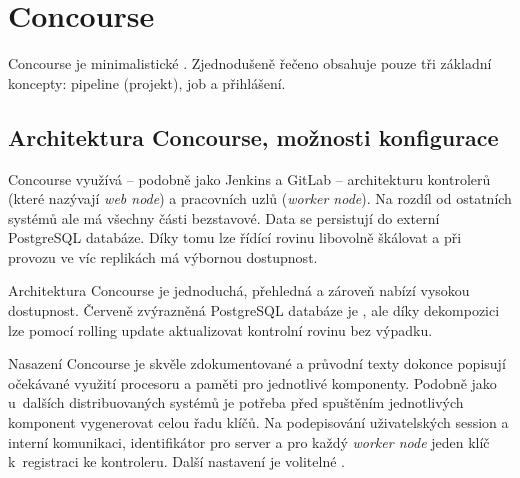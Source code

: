 \section{Concourse}
    Concourse je minimalistické \CI. Zjednodušeně řečeno obsahuje pouze tři základní koncepty: pipeline (projekt), job a přihlášení.

    \subsection{Architektura Concourse, možnosti konfigurace}
        Concourse využívá -- podobně jako Jenkins a GitLab -- architekturu kontrolerů (které nazývají \textit{web node}) a pracovních uzlů (\textit{worker node}). Na rozdíl od ostatních systémů ale má všechny části bezstavové. Data se persistují do externí PostgreSQL databáze. Díky tomu lze řídící rovinu libovolně škálovat a při provozu ve víc replikách má výbornou dostupnost.

        \begin{iffigure}
            \centering
            \caption{Architektura Concourse je jednoduchá, přehledná a zároveň nabízí vysokou dostupnost. Červeně zvýrazněná PostgreSQL databáze je , ale díky dekompozici lze pomocí rolling update aktualizovat kontrolní rovinu bez výpadku.}
            \label{pic:concourse-architecture}
        \end{iffigure}

        Nasazení Concourse je skvěle zdokumentované a průvodní texty dokonce popisují očekávané využití procesoru a paměti pro jednotlivé komponenty. Podobně jako u~dalších distribuovaných systémů je potřeba před spuštěním jednotlivých komponent vygenerovat celou řadu klíčů. Na podepisování uživatelských session a interní komunikaci, identifikátor pro  server a pro každý \textit{worker node} jeden klíč k~registraci ke kontroleru. Další nastavení je volitelné .

